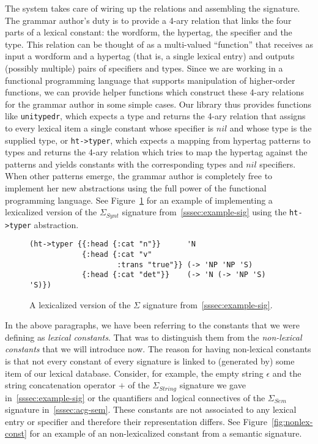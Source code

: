The system takes care of wiring up the relations and assembling the
signature. The grammar author's duty is to provide a 4-ary relation that
links the four parts of a lexical constant: the wordform, the hypertag,
the specifier and the type. This relation can be thought of as a
multi-valued ``function'' that receives as input a wordform and a
hypertag (that is, a single lexical entry) and outputs (possibly
multiple) pairs of specifiers and types. Since we are working in a
functional programming language that supports manipulation of
higher-order functions, we can provide helper functions which construct
these 4-ary relations for the grammar author in some simple cases. Our
library thus provides functions like \texttt{unitypedr}, which expects a
type and returns the 4-ary relation that assigns to every lexical item a
single constant whose specifier is $nil$ and whose type is the supplied
type, or \texttt{ht->typer}, which expects a mapping from hypertag
patterns to types and returns the 4-ary relation which tries to map the
hypertag against the patterns and yields constants with the
corresponding types and $nil$ specifiers. When other patterns emerge,
the grammar author is completely free to implement her new abstractions
using the full power of the functional programming language. See
Figure~\ref{fig:lex-sig-impl} for an example of implementing a
lexicalized version of the $\Sigma_{Synt}$ signature
from~\ref{sssec:example-sig} using the \texttt{ht->typer} abstraction.

\begin{figure}
  \centering
  \begin{verbatim}
(ht->typer {{:head {:cat "n"}}      'N
            {:head {:cat "v"
                    :trans "true"}} (-> 'NP 'NP 'S)
            {:head {:cat "det"}}    (-> 'N (-> 'NP 'S) 'S)})
  \end{verbatim}
  \caption{\label{fig:lex-sig-impl} A lexicalized version of the
    $\Sigma$%
    signature from~\ref{sssec:example-sig}.}
\end{figure}

In the above paragraphs, we have been referring to the constants that we
were defining as \emph{lexical constants}. That was to distinguish them
from the \emph{non-lexical constants} that we will introduce now. The
reason for having non-lexical constants is that not every constant of
every signature is linked to (generated by) some item of our lexical
database. Consider, for example, the empty string $\epsilon$ and the
string concatenation operator $+$ of the $\Sigma_{String}$ signature we
gave in~\ref{sssec:example-sig} or the quantifiers and logical
connectives of the $\Sigma_{Sem}$ signature in~\ref{sssec:acg-sem}.
These constants are not associated to any lexical entry or specifier and
therefore their representation differs. See
Figure~\ref{fig:nonlex-const} for an example of an non-lexicalized
constant from a semantic signature.

